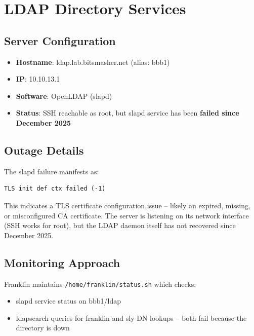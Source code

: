 \section{LDAP Directory Services}

\subsection{Server Configuration}

\begin{itemize}
    \item \textbf{Hostname}: ldap.lab.bitsmasher.net (alias: bbb1)
    
    \item \textbf{IP}: 10.10.13.1
    
    \item \textbf{Software}: OpenLDAP (slapd)
    
    \item \textbf{Status}: SSH reachable as root, but slapd service has been \textbf{failed since December 2025}
\end{itemize}

\subsection{Outage Details}

The slapd failure manifests as:
\begin{lstlisting}[style=mystyle]
TLS init def ctx failed (-1)
    \end{lstlisting}

This indicates a TLS certificate configuration issue -- likely an expired, missing, or misconfigured CA certificate. The server is listening on its network interface (SSH works for root), but the LDAP daemon itself has not recovered since December 2025.

\subsection{Monitoring Approach}

Franklin maintains \texttt{/home/franklin/status.sh} which checks:
\begin{itemize}
    \item slapd service status on bbb1/ldap
    
    \item ldapsearch queries for franklin and sly DN lookups -- both fail because the directory is down
\end{itemize}

